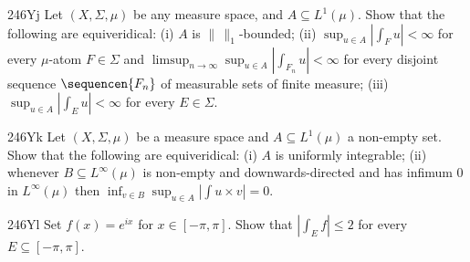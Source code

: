 {\spheader 246Yj Let $(X,\Sigma,\mu)$ be any measure space, and
$A\subseteq L^1(\mu)$.   Show that the following are equiveridical:  (i)
$A$ is $\|\,\|_1$-bounded;   (ii) $\sup_{u\in A}|\int_Fu|<\infty$
for every $\mu$-atom $F\in\Sigma$ and $\limsup_{n\to\infty}\sup_{u\in
A}|\int_{F_n}u|<\infty$ for every disjoint sequence
$\sequencen{F_n}$ of measurable sets of finite measure;  (iii)
$\sup_{u\in A}|\int_Eu|<\infty$ for every $E\in\Sigma$.   


\spheader 246Yk Let $(X,\Sigma,\mu)$ be a measure space and $A\subseteq
L^1(\mu)$ a non-empty set.   Show that the following are equiveridical:
(i) $A$ is uniformly integrable;  (ii) whenever $B\subseteq
L^{\infty}(\mu)$ is non-empty and downwards-directed and has infimum $0$
in $L^{\infty}(\mu)$ then $\inf_{v\in B}\sup_{u\in A}|\int u\times
v|=0$.   

\spheader 246Yl Set $f(x)=e^{ix}$ for $x\in[-\pi,\pi]$.   Show that
$|\int_Ef|\le 2$ for every $E\subseteq[-\pi,\pi]$.
}%

